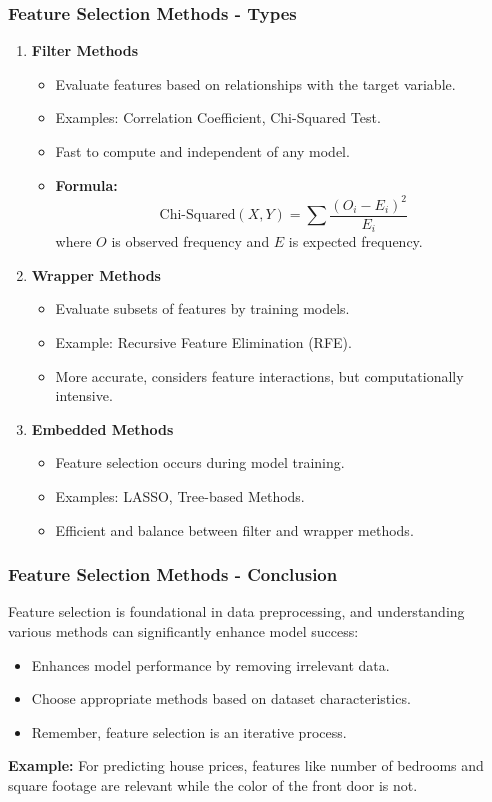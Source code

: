 \documentclass[aspectratio=169]{beamer}
\begin{document}
\begin{frame}[fragile]
    \frametitle{Feature Selection Methods - Types}
    \begin{enumerate}
        \item \textbf{Filter Methods}
            \begin{itemize}
                \item Evaluate features based on relationships with the target variable.
                \item Examples: Correlation Coefficient, Chi-Squared Test.
                \item Fast to compute and independent of any model.
                \item \textbf{Formula:}
                \[
                \text{Chi-Squared}(X, Y) = \sum \frac{(O_i - E_i)^2}{E_i}
                \]
                where \(O\) is observed frequency and \(E\) is expected frequency.
            \end{itemize}
        \item \textbf{Wrapper Methods}
            \begin{itemize}
                \item Evaluate subsets of features by training models.
                \item Example: Recursive Feature Elimination (RFE).
                \item More accurate, considers feature interactions, but computationally intensive.
            \end{itemize}
        \item \textbf{Embedded Methods}
            \begin{itemize}
                \item Feature selection occurs during model training.
                \item Examples: LASSO, Tree-based Methods.
                \item Efficient and balance between filter and wrapper methods.
            \end{itemize}
    \end{enumerate}
\end{frame}

\begin{frame}[fragile]
    \frametitle{Feature Selection Methods - Conclusion}
    Feature selection is foundational in data preprocessing, and understanding various methods can significantly enhance model success:
    \begin{itemize}
        \item Enhances model performance by removing irrelevant data.
        \item Choose appropriate methods based on dataset characteristics.
        \item Remember, feature selection is an iterative process.
    \end{itemize}
    \textbf{Example:} For predicting house prices, features like number of bedrooms and square footage are relevant while the color of the front door is not.
\end{frame}
\end{document}
